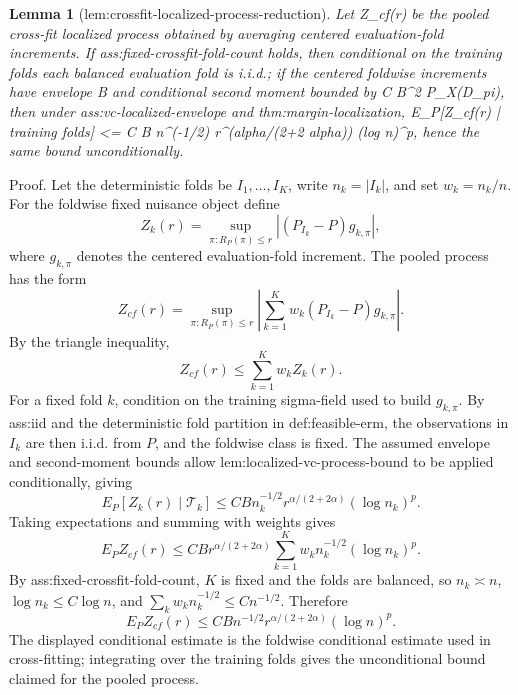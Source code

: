 \documentclass{article}
\newtheorem{lemma}{Lemma}
\begin{document}
\begin{lemma}[lem:crossfit-localized-process-reduction]\label{lem:crossfit-localized-process-reduction}
Let Z_cf(r) be the pooled cross-fit localized process obtained by averaging centered evaluation-fold increments. If ass:fixed-crossfit-fold-count holds, then conditional on the training folds each balanced evaluation fold is i.i.d.; if the centered foldwise increments have envelope B and conditional second moment bounded by C B^2 P_X(D_pi), then under ass:vc-localized-envelope and thm:margin-localization, E_P[Z_cf(r) | training folds] <= C B n^(-1/2) r^(alpha/(2+2 alpha)) (log n)^p, hence the same bound unconditionally.
\end{lemma}
Proof. Let the deterministic folds be \(I_1,\ldots,I_K\), write \(n_k=|I_k|\), and set \(w_k=n_k/n\). For the foldwise fixed nuisance object define
\[
Z_k(r)=\sup_{\pi:R_P(\pi)\le r}\left|(P_{I_k}-P)g_{k,\pi}\right|,
\]
where \(g_{k,\pi}\) denotes the centered evaluation-fold increment. The pooled process has the form
\[
Z_{cf}(r)=\sup_{\pi:R_P(\pi)\le r}\left|\sum_{k=1}^K w_k(P_{I_k}-P)g_{k,\pi}\right| .
\]
By the triangle inequality,
\[
Z_{cf}(r)\le \sum_{k=1}^K w_k Z_k(r).
\]
For a fixed fold \(k\), condition on the training sigma-field used to build \(g_{k,\pi}\). By ass:iid and the deterministic fold partition in def:feasible-erm, the observations in \(I_k\) are then i.i.d. from \(P\), and the foldwise class is fixed. The assumed envelope and second-moment bounds allow lem:localized-vc-process-bound to be applied conditionally, giving
\[
E_P[Z_k(r)\mid \mathcal T_k]
\le C B n_k^{-1/2} r^{\alpha/(2+2\alpha)}(\log n_k)^p .
\]
Taking expectations and summing with weights gives
\[
E_P Z_{cf}(r)
\le C B r^{\alpha/(2+2\alpha)}\sum_{k=1}^K w_kn_k^{-1/2}(\log n_k)^p .
\]
By ass:fixed-crossfit-fold-count, \(K\) is fixed and the folds are balanced, so \(n_k\asymp n\), \(\log n_k\le C\log n\), and \(\sum_kw_kn_k^{-1/2}\le C n^{-1/2}\). Therefore
\[
E_P Z_{cf}(r)
\le C B n^{-1/2} r^{\alpha/(2+2\alpha)}(\log n)^p .
\]
The displayed conditional estimate is the foldwise conditional estimate used in cross-fitting; integrating over the training folds gives the unconditional bound claimed for the pooled process.
\end{document}
